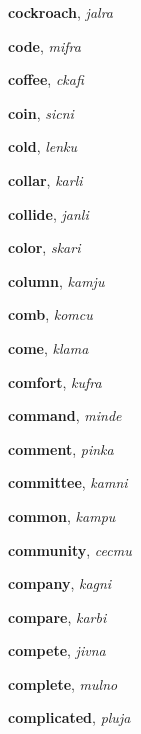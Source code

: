 \documentclass[12pt]{book}
\begin{document}
\begin{description}
\item[ ] \textbf{cockroach}, \textit{jalra}

\item[ ] \textbf{code}, \textit{mifra}

\item[ ] \textbf{coffee}, \textit{ckafi}

\item[ ] \textbf{coin}, \textit{sicni}

\item[ ] \textbf{cold}, \textit{lenku}

\item[ ] \textbf{collar}, \textit{karli}

\item[ ] \textbf{collide}, \textit{janli}

\item[ ] \textbf{color}, \textit{skari}

\item[ ] \textbf{column}, \textit{kamju}

\item[ ] \textbf{comb}, \textit{komcu}

\item[ ] \textbf{come}, \textit{klama}

\item[ ] \textbf{comfort}, \textit{kufra}

\item[ ] \textbf{command}, \textit{minde}

\item[ ] \textbf{comment}, \textit{pinka}

\item[ ] \textbf{committee}, \textit{kamni}

\item[ ] \textbf{common}, \textit{kampu}

\item[ ] \textbf{community}, \textit{cecmu}

\item[ ] \textbf{company}, \textit{kagni}

\item[ ] \textbf{compare}, \textit{karbi}

\item[ ] \textbf{compete}, \textit{jivna}

\item[ ] \textbf{complete}, \textit{mulno}

\item[ ] \textbf{complicated}, \textit{pluja}


\end{description}
\end{document}
